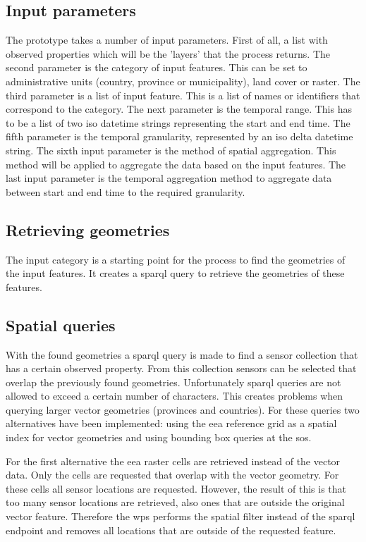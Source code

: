 \subsection{Input parameters}
The prototype takes a number of input parameters. First of all, a list with observed properties which will be the 'layers' that the process returns. The second parameter is the category of input features. This can be set to administrative units (country, province or municipality), land cover or raster. The third parameter is a list of input feature. This is a list of names or identifiers that correspond to the category. The next parameter is the temporal range. This has to be a list of two \ac{iso} datetime strings representing the start and end time. The fifth parameter is the temporal granularity, represented by an \ac{iso} delta datetime string. The sixth input parameter is the method of spatial aggregation. This method will be applied to aggregate the data based on the input features. The last input parameter is the temporal aggregation method to aggregate data between start and end time to the required granularity.      

\subsection{Retrieving geometries}
The input category is a starting point for the process to find the geometries of the input features. It creates a \ac{sparql} query to retrieve the geometries of these features. 

\subsection{Spatial queries}
With the found geometries a \ac{sparql} query is made to find a sensor collection that has a certain observed property. From this collection sensors can be selected that overlap the previously found geometries. Unfortunately \ac{sparql} queries are not allowed to exceed a certain number of characters. This creates problems when querying larger vector geometries (provinces and countries). For these queries two alternatives have been implemented: using the \ac{eea} reference grid as a spatial index for vector geometries and using bounding box queries at the \ac{sos}. 

For the first alternative the \ac{eea} raster cells are retrieved instead of the vector data. Only the cells are requested that overlap with the vector geometry. For these cells all sensor locations are requested. However, the result of this is that too many sensor locations are retrieved, also ones that are outside the original vector feature. Therefore the \ac{wps} performs the spatial filter instead of the \ac{sparql} endpoint and removes all locations that are outside of the requested feature.

